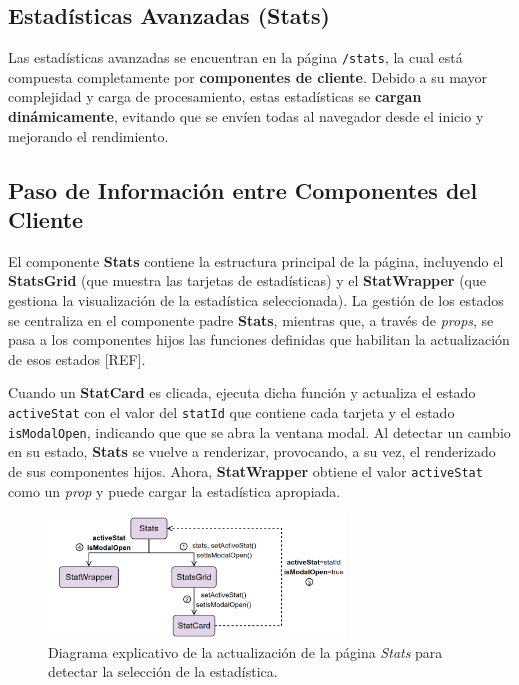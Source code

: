 \subsection{Estadísticas Avanzadas (Stats)}

Las estadísticas avanzadas se encuentran en la página \texttt{/stats}, la cual está compuesta completamente por \textbf{componentes de cliente}. Debido a su mayor complejidad y carga de procesamiento, estas estadísticas se \textbf{cargan dinámicamente}, evitando que se envíen todas al navegador desde el inicio y mejorando el rendimiento.

\subsection*{Paso de Información entre Componentes del Cliente}

El componente \textbf{Stats} contiene la estructura principal de la página, incluyendo el \textbf{StatsGrid} (que muestra las tarjetas de estadísticas) y el \textbf{StatWrapper} (que gestiona la visualización de la estadística seleccionada). La gestión de los estados se centraliza en el componente padre \textbf{Stats}, mientras que, a través de \textit{props}, se pasa a los componentes hijos las funciones definidas que habilitan la actualización de esos estados [REF].

Cuando un \textbf{StatCard} es clicada, ejecuta dicha función y actualiza el estado \texttt{activeStat} con el valor del \texttt{statId} que contiene cada tarjeta y el estado \texttt{isModalOpen}, indicando que que se abra la ventana modal. Al detectar un cambio en su estado, \textbf{Stats} se vuelve a renderizar, provocando, a su vez, el renderizado de sus componentes hijos. Ahora, \textbf{StatWrapper} obtiene el valor \texttt{activeStat} como un \textit{prop} y puede cargar la estadística apropiada.

\begin{figure}[H]
    \centering
    \includegraphics[width=0.7\textwidth]{figures/implementacion/actualizacion_stats.png}
    \vspace{10pt}
    \caption{Diagrama explicativo de la actualización de la página \textit{Stats} para detectar la selección de la estadística.}
    \label{fig:actualizacion_stats}
\end{figure}

